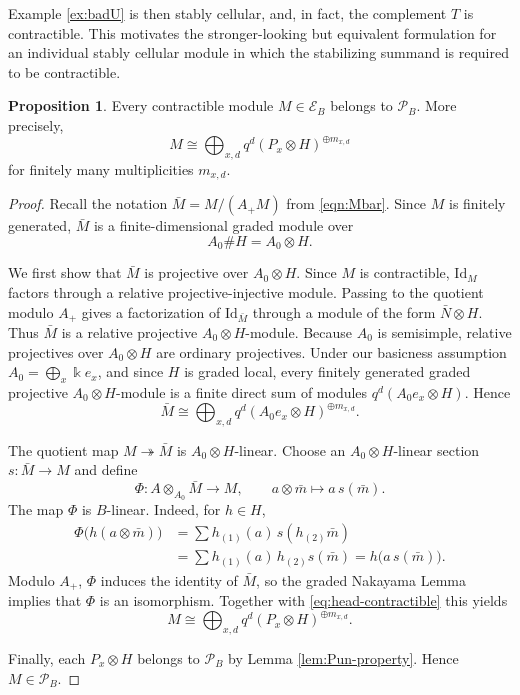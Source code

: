 \documentclass[11pt]{article}
\theoremstyle{definition}
\newtheorem{prop}[thm]{Proposition}
\numberwithin{equation}{section}
\def\Id{\mathrm{Id}}
\newcommand{\kk}{\Bbbk}
\newcommand{\Pun}{\mathcal{P}_B}
\newcommand{\Ecat}{\mathcal{E}_B}
\begin{document}
Example \ref{ex:badU} is then stably cellular, and, in fact, the complement $T$ is contractible.  This motivates the stronger-looking but equivalent formulation for an
individual stably cellular module in which the stabilizing summand is required to be contractible.



\begin{prop}\label{prop:contractible-cellular}
Every contractible module $M\in \Ecat$ belongs to $\Pun$.
More precisely,
\[
M\cong
\bigoplus_{x,d}q^d(P_x\otimes H)^{\oplus m_{x,d}}
\]
for finitely many multiplicities $m_{x,d}$.
\end{prop}

\begin{proof}
Recall the notation $\bar{M}=M/(A_+M)$ from
\eqref{eqn:Mbar}.
Since $M$ is finitely generated, $\bar M$ is a finite-dimensional graded
module over
\[
A_0\#H=A_0\otimes H.
\]

We first show that $\bar M$ is projective over $A_0\otimes H$.  Since
$M$ is contractible, $\Id_M$ factors through a relative
projective-injective module.  Passing to the quotient modulo $A_+$ gives a
factorization of $\Id_{\bar M}$ through a module of the form
$\bar N\otimes H$.  Thus $\bar M$ is a relative projective
$A_0\otimes H$-module.  Because $A_0$ is semisimple, relative projectives over
$A_0\otimes H$ are ordinary projectives.  Under our basicness assumption
$A_0=\bigoplus_x\kk e_x$, and since $H$ is graded local, every finitely
generated graded projective $A_0\otimes H$-module is a finite direct sum of
modules $q^d(A_0e_x\otimes H)$.  Hence
\begin{equation}\label{eq:head-contractible}
\bar M\cong
\bigoplus_{x,d}
q^d(A_0e_x\otimes H)^{\oplus m_{x,d}}.
\end{equation}

The quotient map $M\twoheadrightarrow\bar M$ is $A_0\otimes H$-linear.
Choose an $A_0\otimes H$-linear section
$s:\bar M\to M$ and define
\[
\Phi:A\otimes_{A_0}\bar M\longrightarrow M,
\qquad
a\otimes\bar m\longmapsto a\,s(\bar m).
\]
The map $\Phi$ is $B$-linear.  Indeed, for $h\in H$,
\[
\begin{aligned}
\Phi\bigl(h(a\otimes\bar m)\bigr)
&=\sum h_{(1)}(a)\,s(h_{(2)}\bar m)\\
&=\sum h_{(1)}(a)\,h_{(2)}s(\bar m)
=h\bigl(a\,s(\bar m)\bigr).
\end{aligned}
\]
Modulo $A_+$, $\Phi$ induces the identity of $\bar M$, so the graded
Nakayama Lemma implies that $\Phi$ is an isomorphism.
Together with \eqref{eq:head-contractible} this yields
\[
M\cong
\bigoplus_{x,d}
q^d(P_x\otimes H)^{\oplus m_{x,d}}.
\]

Finally, each $P_x\otimes H$ belongs to $\Pun$ by Lemma \ref{lem:Pun-property}. Hence $M \in \Pun$. 
\end{proof}
\end{document}
